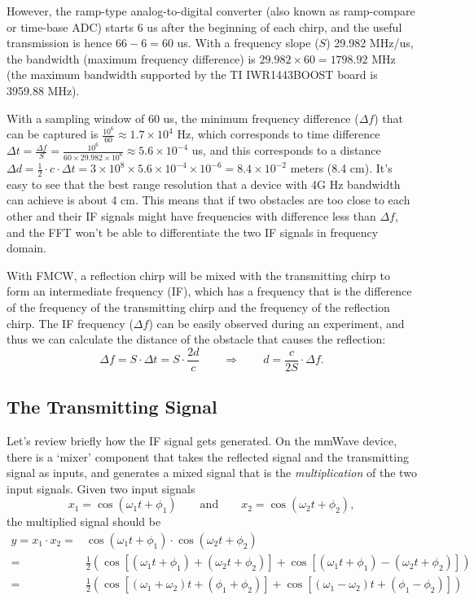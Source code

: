\documentclass[11pt, oneside]{article}   	%
\begin{document}
However, the ramp-type analog-to-digital converter (also known as ramp-compare or time-base ADC) starts 6 us after the beginning of each chirp, and the useful transmission is hence $66 - 6 = 60$ us. With a frequency slope ($S$) 29.982 MHz/us, the bandwidth (maximum frequency difference) is $29.982 \times 60 = 1798.92$ MHz (the maximum bandwidth supported by the TI IWR1443BOOST board is 3959.88 MHz).

With a sampling window of 60 us, the minimum frequency difference ($\Delta f$) that can be captured is $\frac{10^6}{60} \approx 1.7\times 10^4$ Hz, which corresponds to time difference $\Delta t = \frac{\Delta f}{S} = \frac{10^6}{60\times 29.982 \times 10^6} \approx 5.6\times 10^{-4}$ us, and this corresponds to a distance $\Delta d = \frac{1}{2}\cdot c\cdot \Delta t = 3\times 10^8 \times 5.6\times 10^{-4}\times 10^{-6} = 8.4\times 10^{-2}$ meters (8.4 cm). It's easy to see that the best range resolution that a device with 4G Hz bandwidth can achieve is about 4 cm. This means that if two obstacles are too close to each other and their IF signals might have frequencies with difference less than $\Delta f$, and the FFT won't be able to differentiate the two IF signals in frequency domain.

With FMCW, a reflection chirp will be mixed with the transmitting chirp to form an intermediate frequency (IF), which has a frequency that is the difference of the frequency of the transmitting chirp and the frequency of the reflection chirp. The IF frequency ($\Delta f$) can be easily observed during an experiment, and thus we can calculate the distance of the obstacle that causes the reflection: 
$$\Delta f = S\cdot \Delta t = S\cdot \frac{2d}{c} \qquad \Rightarrow \qquad d = \frac{c}{2S}\cdot \Delta f.$$

\subsection{The Transmitting Signal}
Let's review briefly how the IF signal gets generated. On the mmWave device, there is a `mixer'  component that takes the reflected signal and the transmitting signal as inputs, and generates a mixed signal that is the \emph{multiplication} of the two input signals. Given two input signals 
$$x_1 = \cos(\omega_1 t + \phi_1) \qquad \text{and}\qquad x_2 = \cos(\omega_2 t + \phi_2),$$
the multiplied signal should be 
\begin{align*}
y = x_1 \cdot x_2  = & \cos(\omega_1 t + \phi_1) \cdot \cos(\omega_2 t + \phi_2) \\
= & \frac{1}{2}\left(\cos\left[(\omega_1 t +\phi_1)+ (\omega_2 t +\phi_2)\right]+ \cos\left[(\omega_1 t +\phi_1)- (\omega_2 t +\phi_2)\right]\right)\\
= & \frac{1}{2}\left(\cos\left[(\omega_1 +\omega_2) t + (\phi_1 +\phi_2)\right]+ \cos\left[(\omega_1 - \omega_2) t + (\phi_1 - \phi_2)\right]\right)
\end{align*}
\end{document}
